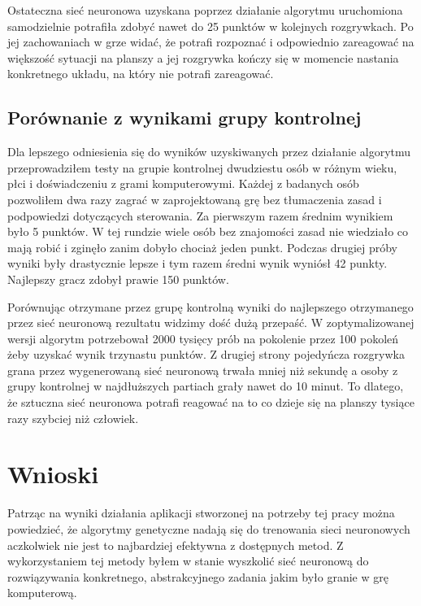 \documentclass[12pt, oneside, a4paper]{report}
\begin{document}
Ostateczna sieć neuronowa uzyskana poprzez działanie algorytmu uruchomiona samodzielnie potrafiła zdobyć nawet do 25 punktów w kolejnych rozgrywkach. Po jej zachowaniach w grze widać, że potrafi rozpoznać i odpowiednio zareagować na większość sytuacji na planszy a jej rozgrywka kończy się w momencie nastania konkretnego układu, na który nie potrafi zareagować.

\section{Porównanie z wynikami grupy kontrolnej}

Dla lepszego odniesienia się do wyników uzyskiwanych przez działanie algorytmu przeprowadziłem testy na grupie kontrolnej dwudziestu osób w różnym wieku, płci i doświadczeniu z grami komputerowymi. Każdej z badanych osób pozwoliłem dwa razy zagrać w zaprojektowaną grę bez tłumaczenia zasad i podpowiedzi dotyczących sterowania. Za pierwszym razem średnim wynikiem było 5 punktów. W tej rundzie wiele osób bez znajomości zasad nie wiedziało co mają robić i zginęło zanim dobyło chociaż jeden punkt. Podczas drugiej próby wyniki były drastycznie lepsze i tym razem średni wynik wyniósł 42 punkty. Najlepszy gracz zdobył prawie 150 punktów. 

Porównując otrzymane przez grupę kontrolną wyniki do najlepszego otrzymanego przez sieć neuronową rezultatu widzimy dość dużą przepaść. W zoptymalizowanej wersji algorytm potrzebował 2000 tysięcy prób na pokolenie przez 100 pokoleń żeby uzyskać wynik trzynastu punktów. Z drugiej strony pojedyńcza rozgrywka grana przez wygenerowaną sieć neuronową trwała mniej niż sekundę a osoby z grupy kontrolnej w najdłuższych partiach grały nawet do 10 minut. To dlatego, że sztuczna sieć neuronowa potrafi reagować na to co dzieje się na planszy tysiące razy szybciej niż człowiek. 


 

\chapter{Wnioski}

Patrząc na wyniki działania aplikacji stworzonej na potrzeby tej pracy można powiedzieć, że algorytmy genetyczne nadają się do trenowania sieci neuronowych aczkolwiek nie jest to najbardziej efektywna z dostępnych metod. Z wykorzystaniem tej metody byłem w stanie wyszkolić sieć neuronową do rozwiązywania konkretnego, abstrakcyjnego zadania jakim było granie w grę komputerową.
\end{document}
